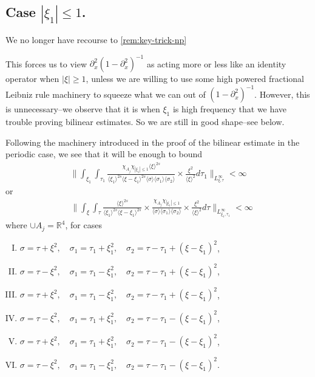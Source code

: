 \documentclass[12pt,reqno]{amsart}
\numberwithin{equation}{section}  %
\newcommand{\rr}{\mathbb{R}}
\newcommand{\p}{\partial}
\begin{document}
\subsection{Case $| \xi_{1}| \le 1$.} 
\label{ssec:xi1-low}
We no longer have recourse to \eqref{rem:key-trick-np} 
\begin{framed}
This forces us to view $\p_{x}^{2}(1- \p_{x}^{2})^{-1}$ as acting more or less like an identity operator when $| \xi | \ge 1$, unless we are willing to use some high powered fractional Leibniz rule machinery to squeeze what we can out of $(1 - \p_{x}^{2})^{-1}$. However, this is unnecessary--we observe that it is when $\xi_{1}$ is high frequency that we have trouble proving bilinear estimates. So we are still in good shape--see below.
\end{framed}
Following the machinery introduced in the proof of the bilinear estimate in the periodic case, we see that it will be enough to bound
%
%
\begin{equation}
  \begin{split}
    \|    \int_{\xi_{1}} \int_{\tau_{1}} \frac{\chi_{A_{j}} \chi_{| \xi_{1} | \le 1 }\langle \xi \rangle ^{2s} }{\langle \xi_{1} \rangle ^{2s} \langle \xi-\xi_{1} \rangle ^{2s} 
    \langle \sigma \rangle   \langle \sigma_{1} \rangle \langle  \sigma_{2}
  \rangle} \times \frac{\xi^{2}}{\langle \xi \rangle ^{2}}
    d \tau_1  \|_{L^{\infty}_{\xi, \tau}} < \infty
  \end{split}
\end{equation}
%
%
or 
\begin{equation}
\begin{split}
  & \| \int_{\xi} \int_{\tau} \frac{\langle \xi \rangle ^{2s}}
  {\langle \xi_{1} \rangle^{2s}\langle \xi - \xi_{1}\rangle ^{2s}} 
   \times \frac{\chi_{A_{j}}
   \chi_{| \xi_{1} | \le 1}}{\langle \sigma \rangle  \langle
    \sigma_{1} \rangle  \langle \sigma_{2} \rangle} 
    \times \frac{\xi^{2}}{\langle \xi \rangle ^{2}}
    d \tau 
  \|_{L^{\infty}_{\xi_{1}, \tau_{1}}} < \infty
\end{split}
\end{equation}
%
%
where $\cup A_{j} = \rr^{4}$, for cases
\begin{enumerate}[(I)]
    \item $ \sigma=\tau+\xi^{2},\quad \sigma_1=\tau_1+\xi_{1}^2,\quad \sigma_2=\tau -
      \tau_1+(\xi - \xi_{1})^2$,
\label{it-1-np}
    \item $ \sigma=\tau-\xi^{2},\quad \sigma_1=\tau_1-\xi_{1}^2,\quad \sigma_2=\tau - \tau_1+(\xi - \xi_{1})^2$,
\label{it-2-np}
    \item  $\sigma=\tau+\xi^{2},\quad \sigma_1=\tau_1-\xi_{1}^2,\quad \sigma_2=\tau - \tau_1+(\xi - \xi_{1})^2$,
      \label{it-3-np}
    \item $\sigma=\tau-\xi^{2},\quad \sigma_1=\tau_1+\xi_{1}^2,\quad \sigma_2=\tau - \tau_1-(\xi - \xi_{1})^2$,
\label{it-4-np}
    \item $\sigma=\tau+\xi^{2},\quad \sigma_1=\tau_1+\xi_{1}^2,\quad \sigma_2=\tau - \tau_1-(\xi - \xi_{1})^2$,
\label{it-5-np}
    \item $\sigma=\tau-\xi^{2},\quad \sigma_1=\tau_1-\xi_{1}^2,\quad \sigma_2=\tau - \tau_1-(\xi - \xi_{1})^2$.
\label{it-6-np}
\end{enumerate}
\end{document}
